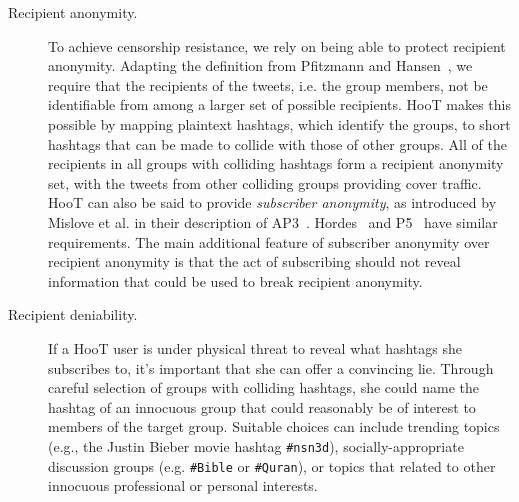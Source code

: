 \begin{description}
\item[Recipient anonymity.] To achieve censorship resistance, we rely on
  being able to protect recipient anonymity. Adapting the definition
  from Pfitzmann and Hansen~\cite{terminology}, we require that the
  recipients of the tweets, i.e. the group members, not be identifiable
  from among a larger set of possible recipients. HooT makes this
  possible by mapping plaintext hashtags, which identify the groups, to
  short hashtags that can be made to collide with those of other
  groups. All of the recipients in all groups with colliding hashtags
  form a recipient anonymity set, with the tweets from other colliding
  groups providing cover traffic. HooT can also be said to provide
  {\em subscriber anonymity}, as introduced by Mislove et al. in their
  description of AP3~\cite{ap3}. Hordes~\cite{hordes} and P5~\cite{P5}
  have similar requirements. The main additional feature of subscriber
  anonymity over recipient anonymity is that the act of subscribing
  should not reveal information that could be used to break recipient
  anonymity.


\item[Recipient deniability.] If a HooT user is under physical threat to
  reveal what hashtags she subscribes to, it's important that she can
  offer a convincing lie. Through careful selection of groups with
  colliding hashtags, she could name the hashtag of an innocuous group
  that could reasonably be of interest to members of the target group.
  Suitable choices can include trending topics (e.g., the Justin Bieber
  movie hashtag {\tt \#nsn3d}), socially-appropriate discussion groups
  (e.g. {\tt \#Bible} or {\tt \#Quran}), or topics that related to
  other innocuous professional or personal interests.


\end{description}
